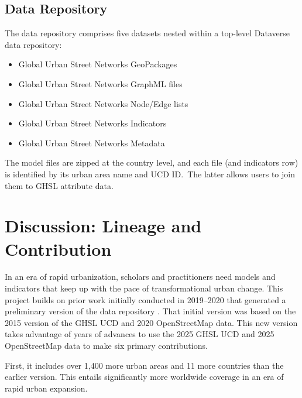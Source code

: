 \documentclass[12pt,letterpaper]{article} %
\begin{document}
\subsection{Data Repository}

The data repository comprises five datasets nested within a top-level Dataverse data repository:

\begin{itemize}
    \item Global Urban Street Networks GeoPackages
    \item Global Urban Street Networks GraphML files
    \item Global Urban Street Networks Node/Edge lists
    \item Global Urban Street Networks Indicators 
    \item Global Urban Street Networks Metadata 
\end{itemize}

The model files are zipped at the country level, and each file (and indicators row) is identified by its urban area name and UCD ID.\ The latter allows users to join them to GHSL attribute data.

\section{Discussion: Lineage and Contribution}

In an era of rapid urbanization, scholars and practitioners need models and indicators that keep up with the pace of transformational urban change. This project builds on prior work initially conducted in 2019--2020 that generated a preliminary version of the data repository \citep{boeing_street_2022}. That initial version was based on the 2015 version of the GHSL UCD and 2020 OpenStreetMap data. This new version takes advantage of years of advances to use the 2025 GHSL UCD and 2025 OpenStreetMap data to make six primary contributions.

First, it includes over 1,400 more urban areas and 11 more countries than the earlier version. This entails significantly more worldwide coverage in an era of rapid urban expansion.
\end{document}
